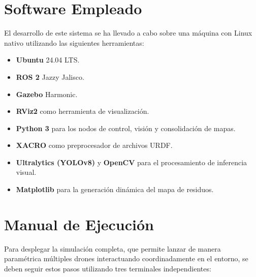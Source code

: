 \documentclass[11pt,a4paper]{article}
\begin{document}
\section{Software Empleado}
El desarrollo de este sistema se ha llevado a cabo sobre una máquina con Linux nativo utilizando las siguientes herramientas:
\begin{itemize}
    \item \textbf{Ubuntu} 24.04 LTS.
    \item \textbf{ROS 2} Jazzy Jalisco.
    \item \textbf{Gazebo} Harmonic.
    \item \textbf{RViz2} como herramienta de visualización.
    \item \textbf{Python 3} para los nodos de control, visión y consolidación de mapas.
    \item \textbf{XACRO} como preprocesador de archivos URDF.
    \item \textbf{Ultralytics (YOLOv8)} y \textbf{OpenCV} para el procesamiento de inferencia visual.
    \item \textbf{Matplotlib} para la generación dinámica del mapa de residuos.
\end{itemize}

\section{Manual de Ejecución}
Para desplegar la simulación completa, que permite lanzar de manera paramétrica múltiples drones interactuando coordinadamente en el entorno, se deben seguir estos pasos utilizando tres terminales independientes:
\end{document}

